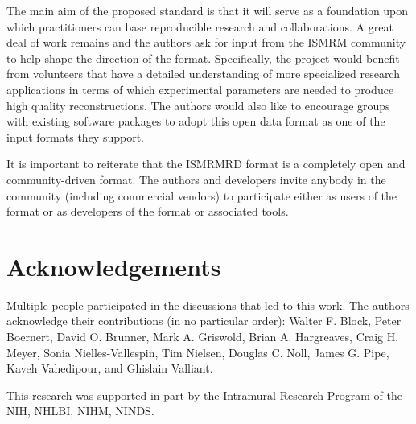 \documentclass[12pt, draft]{article}
\begin{document}
The main aim of the proposed standard is that it will serve as a foundation upon which practitioners can base reproducible research and collaborations.  A great deal of work remains and the authors ask for input from the ISMRM community to help shape the direction of the format. Specifically, the project would benefit from volunteers that have a detailed understanding of more specialized research applications in terms of which experimental parameters are needed to produce high quality reconstructions. The authors would also like to encourage groups with existing software packages to adopt this open data format as one of the input formats they support. 

It is important to reiterate that the ISMRMRD format is a completely open and community-driven format. The authors and developers invite anybody in the community (including commercial vendors) to participate either as users of the format or as developers of the format or associated tools.

\section*{Acknowledgements}
Multiple people participated in the discussions that led to this work.  The authors acknowledge their contributions (in no particular order): 
Walter F. Block,
Peter Boernert,
David O. Brunner,
Mark A. Griswold,
Brian A. Hargreaves,
Craig H. Meyer,
Sonia Nielles-Vallespin,
Tim Nielsen, 
Douglas C. Noll,
James G. Pipe,
Kaveh Vahedipour, and
Ghislain Valliant.

This research was supported in part by the Intramural Research Program of the NIH, NHLBI, NIHM, NINDS.


\end{document}
